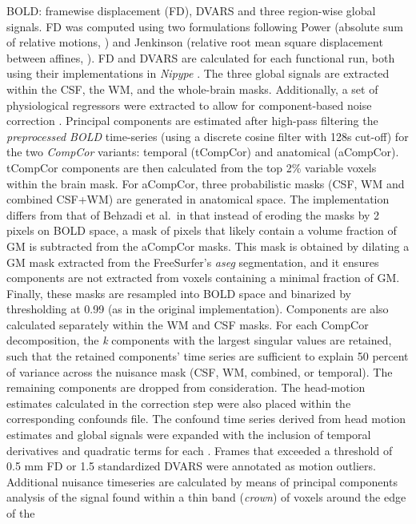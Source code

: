 \documentclass[
]{article}
\begin{document}
\begin{description}
{BOLD}: framewise displacement (FD), DVARS and three region-wise global
signals. FD was computed using two formulations following Power
(absolute sum of relative motions, \citet{power_fd_dvars}) and Jenkinson
(relative root mean square displacement between affines,
\citet{mcflirt}). FD and DVARS are calculated for each functional run,
both using their implementations in \emph{Nipype} \citep[following the
definitions by][]{power_fd_dvars}. The three global signals are
extracted within the CSF, the WM, and the whole-brain masks.
Additionally, a set of physiological regressors were extracted to allow
for component-based noise correction \citep[\emph{CompCor},][]{compcor}.
Principal components are estimated after high-pass filtering the
\emph{preprocessed BOLD} time-series (using a discrete cosine filter
with 128s cut-off) for the two \emph{CompCor} variants: temporal
(tCompCor) and anatomical (aCompCor). tCompCor components are then
calculated from the top 2\% variable voxels within the brain mask. For
aCompCor, three probabilistic masks (CSF, WM and combined CSF+WM) are
generated in anatomical space. The implementation differs from that of
Behzadi et al.~in that instead of eroding the masks by 2 pixels on BOLD
space, a mask of pixels that likely contain a volume fraction of GM is
subtracted from the aCompCor masks. This mask is obtained by dilating a
GM mask extracted from the FreeSurfer's \emph{aseg} segmentation, and it
ensures components are not extracted from voxels containing a minimal
fraction of GM. Finally, these masks are resampled into BOLD space and
binarized by thresholding at 0.99 (as in the original implementation).
Components are also calculated separately within the WM and CSF masks.
For each CompCor decomposition, the \emph{k} components with the largest
singular values are retained, such that the retained components' time
series are sufficient to explain 50 percent of variance across the
nuisance mask (CSF, WM, combined, or temporal). The remaining components
are dropped from consideration. The head-motion estimates calculated in
the correction step were also placed within the corresponding confounds
file. The confound time series derived from head motion estimates and
global signals were expanded with the inclusion of temporal derivatives
and quadratic terms for each \citep{confounds_satterthwaite_2013}.
Frames that exceeded a threshold of 0.5 mm FD or 1.5 standardized DVARS
were annotated as motion outliers. Additional nuisance timeseries are
calculated by means of principal components analysis of the signal found
within a thin band (\emph{crown}) of voxels around the edge of the

\end{description}
\end{document}
